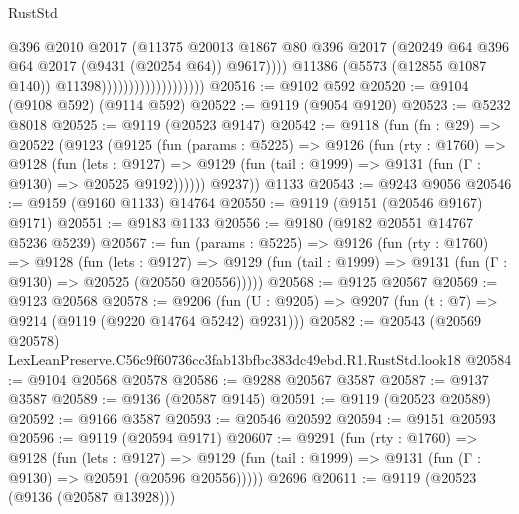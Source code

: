 \begin{lexlean}{RustStd}
\begin{coremodule}
                                              @396
                                              @2010
                                              @2017
                                              (@11375
                                                @20013
                                                @1867
                                                @80
                                                @396
                                                @2017
                                                (@20249
                                                  @64
                                                  @396
                                                  @64
                                                  @2017
                                                  (@9431 (@20254 @64))
                                                  @9617))))
                                          @11386
                                          (@5573 (@12855 @1087 @140))
                                          @11398)))))))))))))))))))
@20516 := @9102 @592
@20520 := @9104 (@9108 @592) (@9114 @592)
@20522 := @9119 (@9054 @9120)
@20523 := @5232 @8018
@20525 := @9119 (@20523 @9147)
@20542 := @9118
    (fun (fn : @29) =>
    @20522
      (@9123
        (@9125
          (fun (params : @5225) =>
          @9126
            (fun (rty : @1760) =>
            @9128
              (fun (lets : @9127) =>
              @9129 (fun (tail : @1999) => @9131 (fun (Γ : @9130) => @20525 @9192))))))
        @9237))
    @1133
@20543 := @9243 @9056
@20546 := @9159 (@9160 @1133) @14764
@20550 := @9119 (@9151 (@20546 @9167) @9171)
@20551 := @9183 @1133
@20556 := @9180 (@9182 @20551 @14767 @5236 @5239)
@20567 := fun (params : @5225) =>
  @9126
    (fun (rty : @1760) =>
    @9128
      (fun (lets : @9127) =>
      @9129 (fun (tail : @1999) => @9131 (fun (Γ : @9130) => @20525 (@20550 @20556)))))
@20568 := @9125 @20567
@20569 := @9123 @20568
@20578 := @9206
    (fun (U : @9205) => @9207 (fun (t : @7) => @9214 (@9119 (@9220 @14764 @5242) @9231)))
@20582 := @20543 (@20569 @20578) LexLeanPreserve.C56c9f60736cc3fab13bfbc383dc49ebd.R1.RustStd.look18
@20584 := @9104 @20568 @20578
@20586 := @9288 @20567 @3587
@20587 := @9137 @3587
@20589 := @9136 (@20587 @9145)
@20591 := @9119 (@20523 @20589)
@20592 := @9166 @3587
@20593 := @20546 @20592
@20594 := @9151 @20593
@20596 := @9119 (@20594 @9171)
@20607 := @9291
    (fun (rty : @1760) =>
    @9128
      (fun (lets : @9127) =>
      @9129 (fun (tail : @1999) => @9131 (fun (Γ : @9130) => @20591 (@20596 @20556)))))
    @2696
@20611 := @9119 (@20523 (@9136 (@20587 @13928)))

\end{coremodule}
\end{lexlean}
